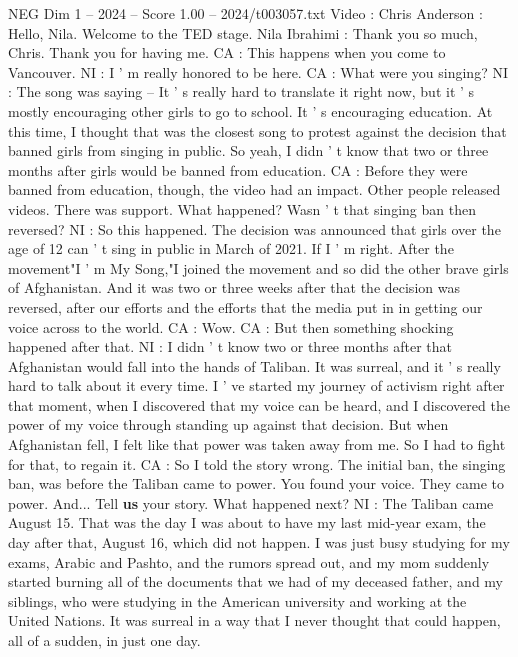 \begin{textsample}{NEG Dim 1 – 2024 – Score 1.00 – 2024/t003057.txt}  \label{ex:f1_neg_032}
Video : Chris Anderson : Hello, Nila.
Welcome to the TED stage.
Nila Ibrahimi : Thank you so much, Chris.
Thank you for having me.
CA : This happens when you come to Vancouver.
NI : I ' m really honored to be here.
CA : What were you singing?
NI : The song was saying -- It ' s really hard to translate it right now, but it ' s mostly encouraging other girls to go to school.
It ' s encouraging education.
At this time, I thought that was the closest song to protest against the decision that banned girls from singing in public.
So yeah, I didn ' t know that two or three months after girls would be banned from education.
CA : Before they were banned from education, though, the video had an impact.
Other people released videos.
There was support.
What happened?
Wasn ' t that singing ban then reversed?
NI : So this happened.
The decision was announced that girls over the age of 12 can ' t sing in public in March of 2021.
If I ' m right.
After the movement"I ' m My Song,"I joined the movement and so did the other brave girls of Afghanistan.
And it was two or three weeks after that the decision was reversed, after our efforts and the efforts that the media put in in getting our voice across to the world.
CA : Wow.
CA : But then something shocking happened after that.
NI : I didn ' t know two or three months after that Afghanistan would fall into the hands of Taliban.
It was surreal, and it ' s really hard to talk about it every time.
I ' ve started my journey of activism right after that moment, when I discovered that my voice can be heard, and I discovered the power of my voice through standing up against that decision.
But when Afghanistan fell, I felt like that power was taken away from me.
So I had to fight for that, to regain it.
CA : So I told the story wrong.
The initial ban, the singing ban, was before the Taliban came to power.
You found your voice.
They came to power.
And...
Tell \textbf{us} your story.
What happened next?
NI : The Taliban came August 15.
That was the day I was about to have my last mid-year exam, the day after that, August 16, which did not happen.
I was just busy studying for my exams, Arabic and Pashto, and the rumors spread out, and my mom suddenly started burning all of the documents that we had of my deceased father, and my siblings, who were studying in the American university and working at the United Nations.
It was surreal in a way that I never thought that could happen, all of a sudden, in just one day.

\end{textsample}
